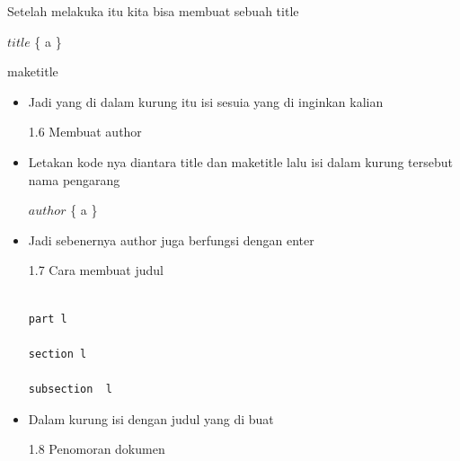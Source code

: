 \vspace{\baselineskip}
 Setelah melakuka itu kita bisa membuat sebuah title\par

\vspace{\baselineskip}
\noindent $title$ \{ a \} \par

\vspace{\baselineskip}
\noindent maketitle\par

\begin{itemize}
	
	\vspace{\baselineskip}
	\item Jadi yang di dalam kurung itu isi sesuia yang di inginkan kalian\par

\vspace{\baselineskip}
1.6 Membuat author\par

\vspace{\baselineskip}
	\item Letakan kode nya diantara title dan maketitle lalu isi dalam kurung tersebut nama pengarang\par

\vspace{\baselineskip}
$author$ \{ a \} \par

	\item Jadi sebenernya author juga berfungsi dengan enter\par

\vspace{\baselineskip}
1.7 Cara membuat judul\par
\begin{verbatim}
	
part l

section l  

subsection  l 
\end{verbatim}

\vspace{\baselineskip}
	\item Dalam kurung isi dengan judul yang di buat\par

\vspace{\baselineskip}
1.8 Penomoran dokumen\par
\begin{verbatim}


\end{verbatim}
\end{itemize}
